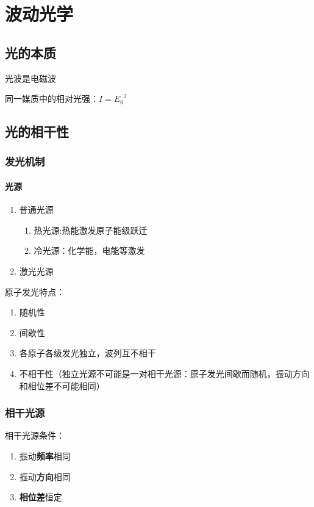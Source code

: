 \chapter{波动光学}

\newpage

\section{光的本质}

光波是电磁波

同一媒质中的相对光强：$I={E_0}^2$

\section{光的相干性}

\subsection{发光机制}

\subsubsection{光源}

\begin{enumerate}
    \item 普通光源
          \begin{enumerate}
              \item 热光源:热能激发原子能级跃迁
              \item 冷光源：化学能，电能等激发
          \end{enumerate}
    \item 激光光源
\end{enumerate}

原子发光特点：
\begin{enumerate}
    \item 随机性
    \item 间歇性
    \item 各原子各级发光独立，波列互不相干
    \item 不相干性（独立光源不可能是一对相干光源：原子发光间歇而随机，振动方向和相位差不可能相同）
\end{enumerate}

\subsection{相干光源}

相干光源条件：
\begin{enumerate}
    \item 振动\textbf{频率}相同
    \item 振动\textbf{方向}相同
    \item \textbf{相位差}恒定
\end{enumerate}

